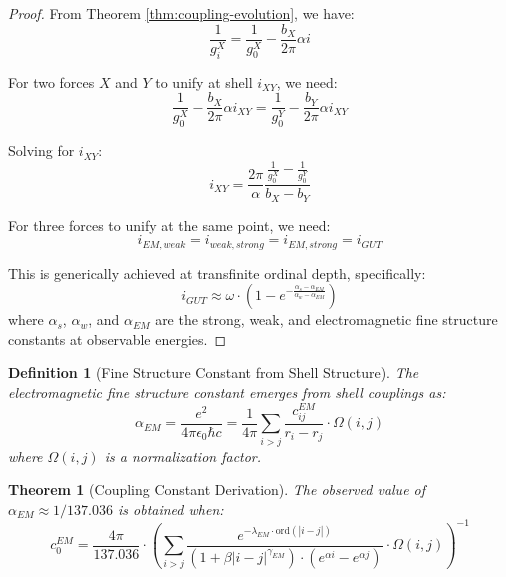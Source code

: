 \documentclass[12pt,a4paper]{article}
\newtheorem{theorem}{Theorem}[section]
\newtheorem{definition}{Definition}[section]
\newcommand{\ord}{\text{ord}}
\begin{document}
\begin{proof}
From Theorem \ref{thm:coupling-evolution}, we have:
\begin{equation}
\frac{1}{g_i^X} = \frac{1}{g_0^X} - \frac{b_X}{2\pi} \alpha i
\end{equation}

For two forces $X$ and $Y$ to unify at shell $i_{XY}$, we need:
\begin{equation}
\frac{1}{g_0^X} - \frac{b_X}{2\pi} \alpha i_{XY} = \frac{1}{g_0^Y} - \frac{b_Y}{2\pi} \alpha i_{XY}
\end{equation}

Solving for $i_{XY}$:
\begin{equation}
i_{XY} = \frac{2\pi}{\alpha} \frac{\frac{1}{g_0^X} - \frac{1}{g_0^Y}}{b_X - b_Y}
\end{equation}

For three forces to unify at the same point, we need:
\begin{equation}
i_{EM,weak} = i_{weak,strong} = i_{EM,strong} = i_{GUT}
\end{equation}

This is generically achieved at transfinite ordinal depth, specifically:
\begin{equation}
i_{GUT} \approx \omega \cdot \left(1 - e^{-\frac{\alpha_s - \alpha_{EM}}{\alpha_w - \alpha_{EM}}}\right)
\end{equation}
where $\alpha_s$, $\alpha_w$, and $\alpha_{EM}$ are the strong, weak, and electromagnetic fine structure constants at observable energies.
\end{proof}

\begin{definition}[Fine Structure Constant from Shell Structure]
\label{def:fine-structure}
The electromagnetic fine structure constant emerges from shell couplings as:
\begin{equation}
\alpha_{EM} = \frac{e^2}{4\pi\epsilon_0\hbar c} = \frac{1}{4\pi} \sum_{i>j} \frac{c_{ij}^{EM}}{r_i - r_j} \cdot \Omega(i,j)
\end{equation}
where $\Omega(i,j)$ is a normalization factor.
\end{definition}

\begin{theorem}[Coupling Constant Derivation]
\label{thm:coupling-derivation}
The observed value of $\alpha_{EM} \approx 1/137.036$ is obtained when:
\begin{equation}
c_0^{EM} = \frac{4\pi}{137.036} \cdot \left(\sum_{i>j} \frac{e^{-\lambda_{EM} \cdot \ord(|i-j|)}}{(1 + \beta |i-j|^{\gamma_{EM}}) \cdot (e^{\alpha i} - e^{\alpha j})} \cdot \Omega(i,j)\right)^{-1}
\end{equation}
\end{theorem}
\end{document}
